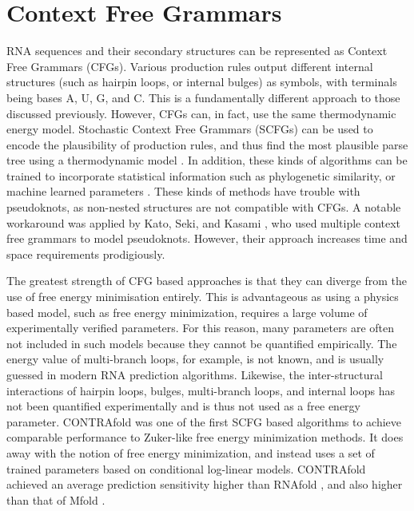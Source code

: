 \documentclass{cshonours}
\begin{document}
\section{Context Free Grammars}
RNA sequences and their secondary structures can be represented as Context Free
Grammars (CFGs). Various production rules output different internal structures (such as
hairpin loops, or internal bulges) as symbols, with terminals being bases A, U, G,
and C. This is a fundamentally different approach to those discussed previously. However, CFGs can, in fact, use the same thermodynamic energy model. Stochastic Context Free Grammars (SCFGs) can be used to encode the plausibility of
production rules, and thus find the most plausible parse tree using a thermodynamic model \cite{rivas2012range}. In addition, these kinds of algorithms can be trained to
incorporate statistical information such as phylogenetic similarity, or machine
learned parameters \cite{rivas2012range}. These kinds of methods have trouble with pseudoknots, as non-nested structures are not compatible with CFGs.
A notable workaround was applied by Kato, Seki, and Kasami \cite{kato2006stochastic}, who used
multiple context free grammars to model pseudoknots. However, their approach
increases time and space requirements prodigiously.


The greatest strength of CFG based approaches is that they
can diverge from the use of free energy minimisation entirely. This is advantageous as using
a physics based model, such as free energy minimization, requires a large volume
of experimentally verified parameters. For this reason, many parameters are often not included in such models because they cannot be quantified empirically.
The energy value of multi-branch loops, for example, is not known, and is usually
guessed in modern RNA prediction algorithms. Likewise, the inter-structural
interactions of hairpin loops, bulges, multi-branch loops, and internal loops has
not been quantified experimentally and is thus not used as a free energy parameter. CONTRAfold \cite{do2006contrafold} was one of the first SCFG based algorithms to achieve
comparable performance to Zuker-like free energy minimization methods. It does
away with the notion of free energy minimization, and instead uses a
set of trained parameters based on conditional log-linear models. CONTRAfold
achieved an average prediction sensitivity higher than RNAfold \cite{lorenz2011viennarna}, and also higher
than that of Mfold \cite{zuker2003mfold}.
\end{document}
